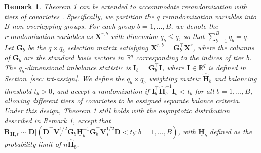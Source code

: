 \documentclass[12pt]{article}
\newtheorem{remark}{Remark}
\newcommand{\bX}{\boldsymbol{X}}\newcommand{\bO}{\boldsymbol{O}}
\newcommand{\bI}{\boldsymbol{I}}
\newcommand{\bD}{\boldsymbol{D}}
\newcommand{\bfV}{\mathbf{V}}
\begin{document}
\begin{remark}\label{rmk: tiers-of-covariates}
{Theorem 1 can be extended to accommodate rerandomization 
with tiers of covariates \citep{morgan2015rerandomization}. Specifically, we partition the $q$ rerandomization variables into $B$ non-overlapping groups. For each group $b = 1, \dots, B$, we denote the rerandomization variables as $\bX^{r,b}$ with dimension $q_b \leq q$, so that $\sum_{b=1}^B q_b = q$. 
Let $\mathbf{G}_b$ be the $q \times q_b$ selection matrix satisfying $\bX^{r,b} = \mathbf{G}_b^\top \bX^r$, where the columns of $\mathbf{G}_b$ are the standard basis vectors in $\mathbb{R}^q$ corresponding to the indices of tier $b$. The $q_b$-dimensional imbalance statistic is $\bI_b = \mathbf{G}_b^\top \bI$, where $\bI \in \mathbb{R}^q$ is defined in Section~\ref{sec: trt-assign}.
We define the $q_b \times q_b$ weighting matrix $\widehat{\mathbf{H}}_b$ and balancing threshold $t_b > 0$, and accept a randomization if $\bI_b^\top \widehat{\mathbf{H}}_b^{-1} \bI_b < t_b$ for all $b = 1, \dots, B$, allowing different tiers of covariates to be assigned separate balance criteria. Under this design, Theorem 1 still holds with the asymptotic distribution described in Remark 1, except that $\boldsymbol{R}_{\mathbf{H},t} \sim \bD|(\bD^\top\bfV_I^{1/2} \mathbf{G}_b \underline{\mathbf{H}}_b^{-1} \mathbf{G}_b^\top \bfV_I^{1/2} \bD < t_b: b = 1,\dots, B)$, with $\underline{\mathbf{H}}_b$ defined as the probability limit of 
$n\widehat{\mathbf{H}}_b$.}
\end{remark}


\end{document}
